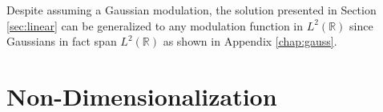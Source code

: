 Despite assuming a Gaussian modulation, the solution presented in Section \ref{sec:linear} can be generalized to any modulation function in $L^2(\mathbb{R})$ since Gaussians in fact span $L^2(\mathbb{R})$ as shown in Appendix \ref{chap:gauss}.

%

\section{Non-Dimensionalization}

%
%
%

